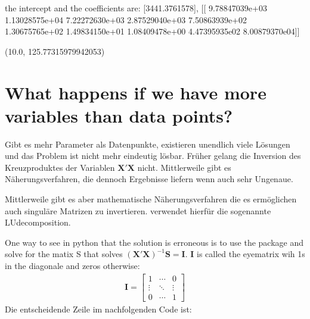 \documentclass[letterpaper,10pt,english]{jupyterBook}
\begin{document}
\begin{sphinxVerbatim}[commandchars=\\\{\}]
the intercept and the coefficients are: [\PYGZhy{}3441.3761578], [[ 9.78847039e+03 \PYGZhy{}1.13028575e+04  7.22272630e+03 \PYGZhy{}2.87529040e+03
   7.50863939e+02 \PYGZhy{}1.30675765e+02  1.49834150e+01 \PYGZhy{}1.08409478e+00
   4.47395935e\PYGZhy{}02 \PYGZhy{}8.00879370e\PYGZhy{}04]]
\end{sphinxVerbatim}

\begin{sphinxVerbatim}[commandchars=\\\{\}]
(\PYGZhy{}10.0, 125.77315979942053)
\end{sphinxVerbatim}

\noindent{}


\chapter{What happens if we have more variables than data points?}
\label{\detokenize{Regression_Techniques:what-happens-if-we-have-more-variables-than-data-points}}
\sphinxAtStartPar
Gibt es mehr Parameter als Datenpunkte, existieren unendlich viele Lösungen und das Problem ist nicht mehr eindeutig lösbar. Früher gelang die Inversion des Kreuzproduktes der Variablen \(\mathbf{X}'\mathbf{X}\) nicht. Mittlerweile gibt es Näherungsverfahren, die dennoch Ergebnisse liefern \sphinxhyphen{} wenn auch sehr Ungenaue.

\sphinxAtStartPar
Mittlerweile gibt es aber mathematische Näherungsverfahren die es ermöglichen auch singuläre Matrizen zu invertieren.
 verwendet hierfür die sogenannte LU\sphinxhyphen{}decomposition.

\sphinxAtStartPar
One way to see in python that the solution is erroneous is to use the  package and solve for the matix S that solves \((\mathbf{X}'\mathbf{X})^{-1} \mathbf{S} = \mathbf{I}\). \(\mathbf{I}\) is called the eye\sphinxhyphen{}matrix wih 1s in the diagonale and zeros otherwise:
\begin{equation*}
\begin{split}
\mathbf{I}=\left[
\begin{array}{ccc}
   1 & \cdots & 0 \\
   \vdots & \ddots & \vdots \\
   0 & \cdots & 1
\end{array}
\right]
\end{split}
\end{equation*}
\sphinxAtStartPar
Die entscheidende Zeile im nachfolgenden Code ist:
\end{document}

